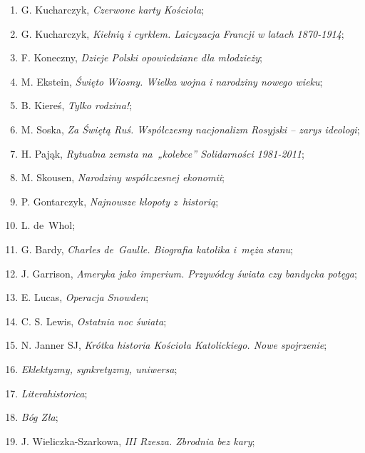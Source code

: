 \documentclass[a4paper,11pt]{article}
\begin{document}
\begin{enumerate}
\item G. Kucharczyk, \emph{Czerwone karty Kościoła};

\item G. Kucharczyk, \emph{Kielnią i cyrklem. Laicyzacja Francji w
    latach 1870-1914};

\item F. Koneczny, \emph{Dzieje Polski opowiedziane dla młodzieży};

\item M. Ekstein, \emph{Święto Wiosny. Wielka wojna i narodziny nowego
    wieku};

\item B. Kiereś, \emph{Tylko rodzina!};

\item M. Soska, \emph{Za Świętą Ruś. Współczesny nacjonalizm Rosyjski
    -- zarys ideologi};

\item H. Pająk, \emph{Rytualna zemsta na~„kolebce” Solidarności
    1981-2011};

\item M. Skousen, \emph{Narodziny współczesnej ekonomii};

\item P. Gontarczyk, \emph{Najnowsze kłopoty z~historią};

\item L. de~Whol;

\item G. Bardy, \emph{Charles de~Gaulle. Biografia katolika i~męża
    stanu};

\item J. Garrison, \emph{Ameryka jako imperium. Przywódcy świata czy
    bandycka potęga};

\item E. Lucas, \emph{Operacja Snowden};

\item C. S. Lewis, \emph{Ostatnia noc świata};

\item N. Janner SJ, \emph{Krótka historia Kościoła Katolickiego. Nowe
    spojrzenie};

\item \emph{Eklektyzmy, synkretyzmy, uniwersa};

\item \emph{Literahistorica};

\item \emph{Bóg Zła};

\item J. Wieliczka-Szarkowa, \emph{III Rzesza. Zbrodnia bez kary};


\end{enumerate}
\end{document}
